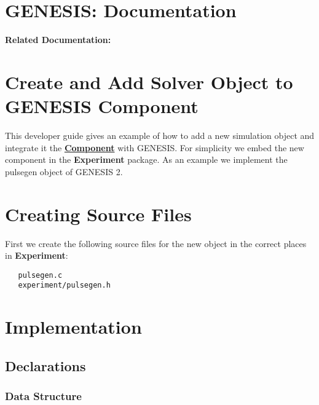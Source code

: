 \documentclass[12pt]{article}
\begin{document}
\section*{GENESIS: Documentation}

{\bf Related Documentation:}

\section*{Create and Add Solver Object to GENESIS Component}

This developer guide gives an example of how to add a new simulation
object and integrate it the
\href{../reserved-words/reserved-words.tex}{\bf Component} with
GENESIS.  For simplicity we embed the new component in the {\bf
  Experiment} package.  As an example we implement the pulsegen object
of GENESIS 2.

\section*{Creating Source Files}

First we create the following source files for the new object in the correct places in {\bf Experiment}:
\begin{verbatim}
   pulsegen.c
   experiment/pulsegen.h
\end{verbatim}

\section*{Implementation}

\subsection*{Declarations}

\subsubsection*{Data Structure}
\end{document}
